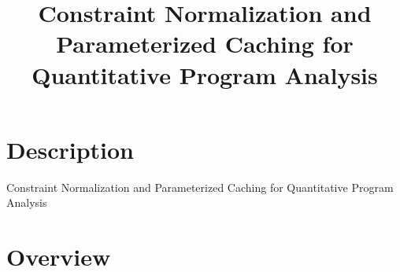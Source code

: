 \documentclass{article}\usepackage[]{graphicx}\usepackage[]{color}
\begin{document}
\title{Constraint Normalization and Parameterized Caching for Quantitative Program Analysis}
\author{}
\maketitle




\section{Description}
Constraint Normalization and Parameterized Caching for Quantitative Program Analysis



\section{Overview}
\end{document}
